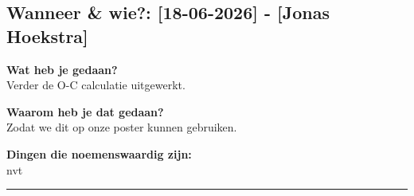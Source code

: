 
\subsection*{Wanneer \& wie?: [18-06-2026] - [Jonas Hoekstra]}

\textbf{Wat heb je gedaan?}\\
Verder de O-C calculatie uitgewerkt.
\vspace{0.3cm} 

\noindent \textbf{Waarom heb je dat gedaan?}\\
Zodat we dit op onze poster kunnen gebruiken.

\noindent \textbf{Dingen die noemenswaardig zijn:}\\
nvt


\vspace{0.5cm}
\hrule 
\vspace{0.5cm}